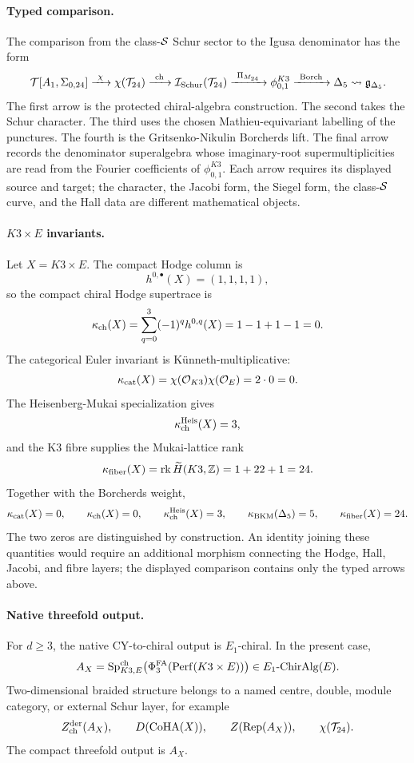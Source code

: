 \paragraph{Typed comparison.}
The comparison from the class-\(\mathcal{S}\) Schur sector to the Igusa
denominator has the form
\[
  \mathcal{T}[A_1,\Sigma_{0,24}]
  \xrightarrow{\ \chi\ }
  \chi(\mathcal{T}_{24})
  \xrightarrow{\ \operatorname{ch}\ }
  \mathcal{I}_{\mathrm{Schur}}(\mathcal{T}_{24})
  \xrightarrow{\ \Pi_{M_{24}}\ }
  \phi_{0,1}^{K3}
  \xrightarrow{\ \mathrm{Borch}\ }
  \Delta_5
  \rightsquigarrow
  \mathfrak{g}_{\Delta_5}.
\]
The first arrow is the protected chiral-algebra construction. The
second takes the Schur character. The third uses the chosen
Mathieu-equivariant labelling of the punctures. The fourth is the
Gritsenko-Nikulin Borcherds lift. The final arrow records the
denominator superalgebra whose imaginary-root supermultiplicities are
read from the Fourier coefficients of \(\phi_{0,1}^{K3}\). Each arrow
requires its displayed source and target; the character, the Jacobi
form, the Siegel form, the class-\(\mathcal{S}\) curve, and the Hall data are
different mathematical objects.

\paragraph{\texorpdfstring{$K3\times E$}{K3xE} invariants.}
Let \(X=K3\times E\). The compact Hodge column is
\[
  h^{0,\bullet}(X)=(1,1,1,1),
\]
so the compact chiral Hodge supertrace is
\[
  \kappa_{\mathrm{ch}}(X)=\sum_{q=0}^{3}(-1)^qh^{0,q}(X)=1-1+1-1=0.
\]
The categorical Euler invariant is K\"unneth-multiplicative:
\[
  \kappa_{\mathrm{cat}}(X)=\chi(\mathcal{O}_{K3})\chi(\mathcal{O}_E)=2\cdot0=0.
\]
The Heisenberg-Mukai specialization gives
\[
  \kappa_{\mathrm{ch}}^{\mathrm{Heis}}(X)=3,
\]
and the K3 fibre supplies the Mukai-lattice rank
\[
  \kappa_{\mathrm{fiber}}(X)=\operatorname{rk}\widetilde H(K3,\mathbb{Z})=1+22+1=24.
\]
Together with the Borcherds weight,
\[
  \kappa_{\mathrm{cat}}(X)=0,\qquad
  \kappa_{\mathrm{ch}}(X)=0,\qquad
  \kappa_{\mathrm{ch}}^{\mathrm{Heis}}(X)=3,\qquad
  \kappa_{\mathrm{BKM}}(\Delta_5)=5,\qquad
  \kappa_{\mathrm{fiber}}(X)=24.
\]
The two zeros are distinguished by construction. An identity joining
these quantities would require an additional morphism connecting the
Hodge, Hall, Jacobi, and fibre layers; the displayed comparison contains
only the typed arrows above.

\paragraph{Native threefold output.}
For \(d\geq3\), the native CY-to-chiral output is \(E_1\)-chiral. In
the present case,
\[
  A_X=
  \mathrm{Sp}^{\mathrm{ch}}_{K3,E}\bigl(\Phi^{\mathrm{FA}}_3(\mathrm{Perf}(K3\times E))\bigr)
  \in E_1\text{-}\mathrm{ChirAlg}(E).
\]
Two-dimensional braided structure belongs to a named centre, double,
module category, or external Schur layer, for example
\[
  Z^{\mathrm{der}}_{\mathrm{ch}}(A_X),
  \qquad
  D(\mathrm{CoHA}(X)),
  \qquad
  Z(\operatorname{Rep}(A_X)),
  \qquad
  \chi(\mathcal{T}_{24}).
\]
The compact threefold output is \(A_X\).

